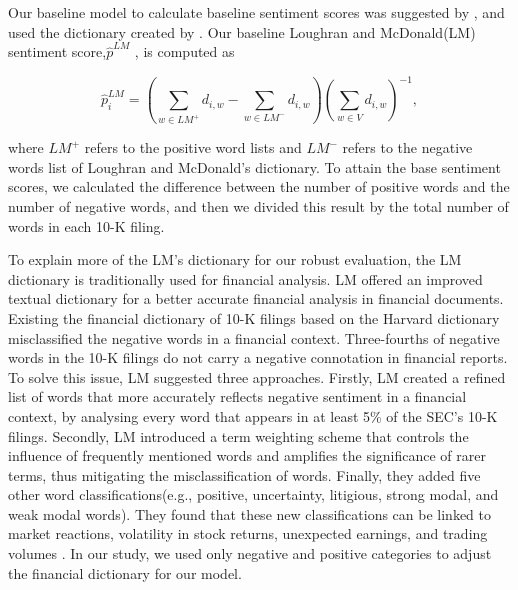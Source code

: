\documentclass[logo,bsc,singlespacing,parskip]{infthesis}
\begin{document}
Our baseline model to calculate baseline sentiment scores was suggested by \cite{Garcia2013}, and used the dictionary created by \cite{LoughranMcDonald2011}. Our baseline Loughran and McDonald(LM) sentiment score,$\hat{p}^{LM}$ , is computed as

\begin{equation} \label{5.2}
\hat{p}_i^{LM} = \left( \sum_{w \in LM^+} d_{i,w} - \sum_{w \in LM^-} d_{i,w} \right) \left( \sum_{w \in V} d_{i,w} \right)^{-1},
\end{equation}

where $LM^{+}$ refers to the positive word lists and $LM^{-}$ refers to the negative words list of Loughran and McDonald’s dictionary. To attain the base sentiment scores, we calculated the difference between the number of positive words and the number of negative words, and then we divided this result by the total number of words in each 10-K filing.   

To explain more of the LM’s dictionary for our robust evaluation, the LM dictionary is traditionally used for financial analysis. LM offered an improved textual dictionary for a better accurate financial analysis in financial documents. Existing the financial dictionary of 10-K filings based on the Harvard dictionary misclassified the negative words in a financial context. Three-fourths of negative words in the 10-K filings do not carry a negative connotation in financial reports. To solve this issue, LM suggested three approaches. Firstly, LM created a refined list of words that more accurately reflects negative sentiment in a financial context, by analysing every word that appears in at least 5\% of the SEC’s 10-K filings. Secondly, LM introduced a term weighting scheme that controls the influence of frequently mentioned words and amplifies the significance of rarer terms, thus mitigating the misclassification of words. Finally, they added five other word classifications(e.g., positive, uncertainty, litigious, strong modal, and weak modal words). They found that these new classifications can be linked to market reactions, volatility in stock returns, unexpected earnings, and trading volumes \cite{LoughranMcDonald2011}. In our study, we used only negative and positive categories to adjust the financial dictionary for our model.
\end{document}
